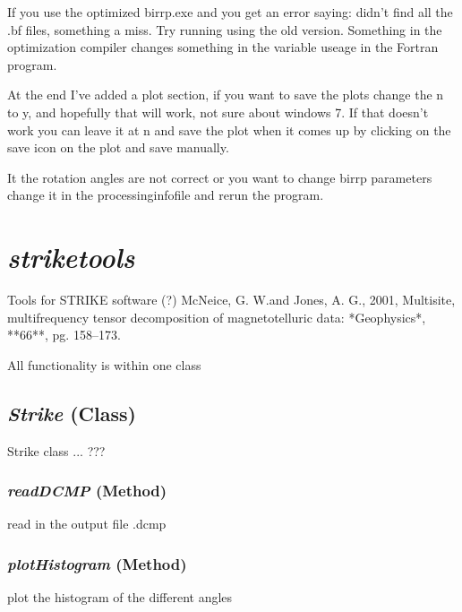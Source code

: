 If you use the optimized birrp.exe and you get an error saying: didn't find all
the .bf files, something a miss.  Try running using the old version.  Something
in the optimization compiler changes something in the variable useage in the
Fortran program.  

At the end I've added a plot section, if you want to save the plots change
the n to y, and hopefully that will work, not sure about windows 7.  If that 
doesn't work you can leave it at n and save the plot when it comes up by
clicking on the save icon on the plot and save manually.

It the rotation angles are not correct or you want to change birrp parameters
change it in the processinginfofile and rerun the program.




\section{\textit{striketools} }
\label{sec:processing.striketools}

Tools for STRIKE software (?) McNeice, G. W.and Jones, A. G., 2001, Multisite, multifrequency tensor 
            decomposition of magnetotelluric data: *Geophysics*, **66**, 
            pg. 158--173.

All functionality is within one class

\subsection{\textit{Strike} (Class)}
\label{ssec:processing.striketools.Strike}

Strike class ... ???

\subsubsection{\textit{readDCMP} (Method)}
\label{sssec:processing.striketools.Strike.readDCMP}

read in the output file .dcmp

\subsubsection{\textit{plotHistogram} (Method)}
\label{sssec:processing.striketools.Strike.plotHistogram}

plot the histogram of the different angles

